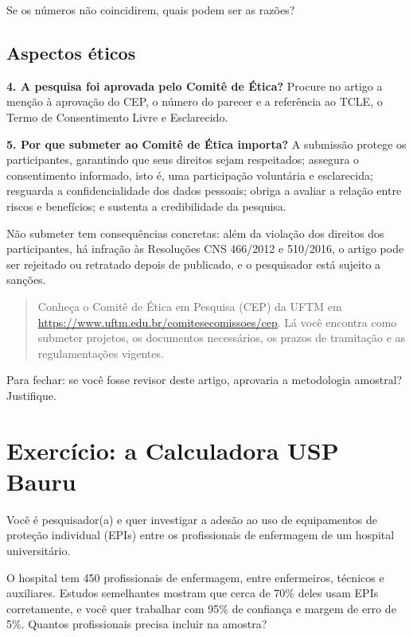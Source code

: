 \documentclass[
]{book}
\begin{document}
Se os números não coincidirem, quais podem ser as razões?

\subsection{Aspectos éticos}\label{aspectos-uxe9ticos}

\textbf{4. A pesquisa foi aprovada pelo Comitê de Ética?} Procure no artigo a menção à aprovação do CEP, o número do parecer e a referência ao TCLE, o Termo de Consentimento Livre e Esclarecido.

\textbf{5. Por que submeter ao Comitê de Ética importa?} A submissão protege os participantes, garantindo que seus direitos sejam respeitados; assegura o consentimento informado, isto é, uma participação voluntária e esclarecida; resguarda a confidencialidade dos dados pessoais; obriga a avaliar a relação entre riscos e benefícios; e sustenta a credibilidade da pesquisa.

Não submeter tem consequências concretas: além da violação dos direitos dos participantes, há infração às Resoluções CNS 466/2012 e 510/2016, o artigo pode ser rejeitado ou retratado depois de publicado, e o pesquisador está sujeito a sanções.

\begin{quote}
Conheça o Comitê de Ética em Pesquisa (CEP) da UFTM em \url{https://www.uftm.edu.br/comitesecomissoes/cep}. Lá você encontra como submeter projetos, os documentos necessários, os prazos de tramitação e as regulamentações vigentes.
\end{quote}

Para fechar: se você fosse revisor deste artigo, aprovaria a metodologia amostral? Justifique.

\section{Exercício: a Calculadora USP Bauru}\label{exercuxedcio-a-calculadora-usp-bauru}

Você é pesquisador(a) e quer investigar a adesão ao uso de equipamentos de proteção individual (EPIs) entre os profissionais de enfermagem de um hospital universitário.

O hospital tem 450 profissionais de enfermagem, entre enfermeiros, técnicos e auxiliares. Estudos semelhantes mostram que cerca de 70\% deles usam EPIs corretamente, e você quer trabalhar com 95\% de confiança e margem de erro de 5\%. Quantos profissionais precisa incluir na amostra?
\end{document}
